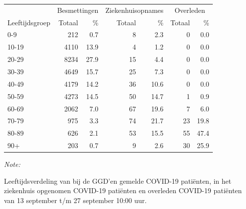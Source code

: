\documentclass[
  english,
  man,floatsintext]{apa6}
\begin{document}
\begin{table}[H]
\centering\begingroup\fontsize{11}{13}\selectfont

\begin{threeparttable}
\begin{tabular}{lrrrrrr}
\toprule
\multicolumn{1}{c}{ } & \multicolumn{2}{c}{Besmettingen} & \multicolumn{2}{c}{Ziekenhuisopnames} & \multicolumn{2}{c}{Overleden} \\
\cmidrule(l{3pt}r{3pt}){2-3} \cmidrule(l{3pt}r{3pt}){4-5} \cmidrule(l{3pt}r{3pt}){6-7}
Leeftijdsgroep & Totaal & \% & Totaal & \% & Totaal & \%\\
\midrule
0-9 & 212 & 0.7 & 8 & 2.3 & 0 & 0.0\\
10-19 & 4110 & 13.9 & 4 & 1.2 & 0 & 0.0\\
20-29 & 8234 & 27.9 & 15 & 4.4 & 0 & 0.0\\
30-39 & 4649 & 15.7 & 25 & 7.3 & 0 & 0.0\\
40-49 & 4179 & 14.2 & 36 & 10.6 & 0 & 0.0\\
50-59 & 4273 & 14.5 & 50 & 14.7 & 1 & 0.9\\
60-69 & 2062 & 7.0 & 67 & 19.6 & 7 & 6.0\\
70-79 & 975 & 3.3 & 74 & 21.7 & 23 & 19.8\\
80-89 & 626 & 2.1 & 53 & 15.5 & 55 & 47.4\\
90+ & 203 & 0.7 & 9 & 2.6 & 30 & 25.9\\
\bottomrule
\end{tabular}
\begin{tablenotes}
\item \textit{Note: } 
\item Leeftijdsverdeling van bij de GGD’en gemelde COVID-19 patiënten, in het ziekenhuis opgenomen COVID-19 patiënten en overleden COVID-19 patiënten van 13 september t/m 27 september 10:00 uur.
\end{tablenotes}
\end{threeparttable}
\endgroup{}
\end{table}
\end{document}
